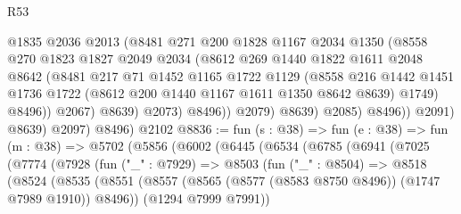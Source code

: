 \begin{lexlean}{R53}
\begin{coremodule}
                            @1835
                            @2036
                            @2013
                            (@8481
                              @271
                              @200
                              @1828
                              @1167
                              @2034
                              @1350
                              (@8558
                                @270
                                @1823
                                @1827
                                @2049
                                @2034
                                (@8612
                                  @269
                                  @1440
                                  @1822
                                  @1611
                                  @2048
                                  @8642
                                  (@8481
                                    @217
                                    @71
                                    @1452
                                    @1165
                                    @1722
                                    @1129
                                    (@8558
                                      @216
                                      @1442
                                      @1451
                                      @1736
                                      @1722
                                      (@8612 @200 @1440 @1167 @1611 @1350 @8642 @8639)
                                      @1749)
                                    @8496))
                                @2067)
                              @8639)
                            @2073)
                          @8496))
                      @2079)
                    @8639)
                  @2085)
                @8496))
            @2091)
          @8639)
        @2097)
      @8496)
    @2102
@8836 := fun (s : @38) =>
  fun (e : @38) =>
  fun (m : @38) =>
  @5702
    (@5856
      (@6002
        (@6445
          (@6534
            (@6785
              (@6941
                (@7025
                  (@7774
                    (@7928
                      (fun ("_" : @7929) =>
                      @8503
                        (fun ("_" : @8504) =>
                        @8518
                          (@8524
                            (@8535
                              (@8551
                                (@8557
                                  (@8565 (@8577 (@8583 @8750 @8496)) (@1747 @7989 @1910))
                                  @8496))
                              (@1294 @7999 @7991))

\end{coremodule}
\end{lexlean}
